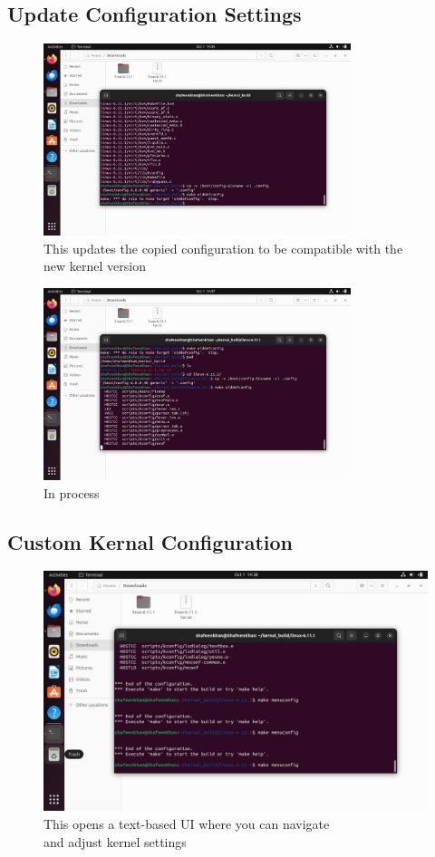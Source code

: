\documentclass{article}
\begin{document}
\subsection{Update Configuration Settings}
\begin{figure}[H]
    \centering
    \includegraphics[width=0.8\textwidth]{64.jpg}
    \caption{This updates the copied configuration to be compatible with the new kernel version}
\end{figure}
\begin{figure}[H]
    \centering
    \includegraphics[width=0.8\textwidth]{63.jpg}
    \caption{In process}
\end{figure}

\subsection{Custom Kernal Configuration}
\begin{figure}[H]
    \centering
    \includegraphics[width=0.8\linewidth]{62.jpg}
    \caption{This opens a text-based UI where you can navigate\\ and adjust kernel settings}
\end{figure}
\end{document}

